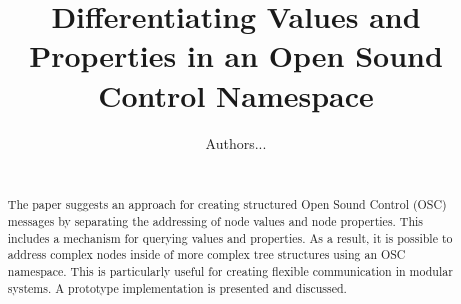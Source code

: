 \documentclass{sig-alternate}
\begin{document}
\lstset{language=XML, basicstyle=\small, stringstyle=\ttfamily}

%

\title{Differentiating Values and Properties in an Open Sound Control Namespace}
\subtitle{}
%
%

%

\author{
%
\alignauthor Authors... \\
       \\
}

\maketitle






\begin{abstract}

The paper suggests an approach for creating structured Open Sound Control (OSC) messages by separating the addressing of node values and node properties.  This includes a mechanism for querying values and properties.  As a result, it is possible to address complex nodes inside of more complex tree structures using an OSC namespace.  This is particularly useful for creating flexible communication in modular systems.  A prototype implementation is presented and discussed.

\end{abstract}
\end{document}
